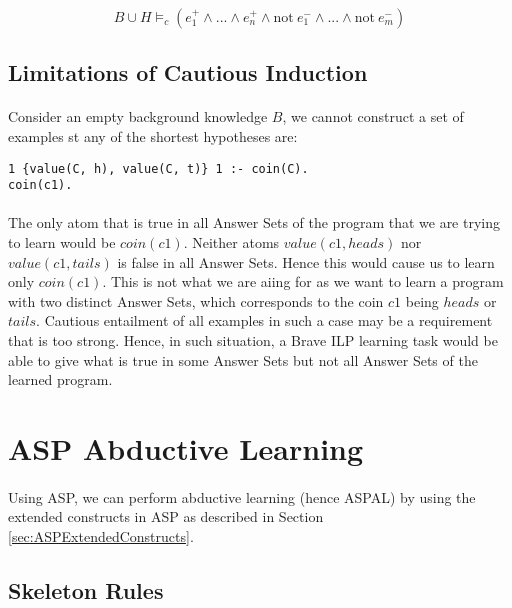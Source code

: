 \documentclass{article}
\theoremstyle{plain}
\theoremstyle{definition}
\begin{document}
\begin{multicols}{2}
$$B \cup H \models_c (e_1^+ \land ... \land e_n^+ \land \text{not}\ e_1^- \land ...  \land \text{not}\ e_m^-)$$

\subsection{Limitations of Cautious Induction}

\paragraph{} Consider an empty background knowledge $B$, we cannot construct a set of examples st any of the shortest hypotheses are:

\begin{lstlisting}
1 {value(C, h), value(C, t)} 1 :- coin(C).
coin(c1).
\end{lstlisting}

\paragraph{} The only atom that is true in all Answer Sets of the program that we are trying to learn would be $coin(c1)$. Neither atoms $value(c1, heads)$ nor $value(c1, tails)$ is false in all Answer Sets. Hence this would cause us to learn only $coin(c1)$. This is not what we are aiing for as we want to learn a program with two distinct Answer Sets, which corresponds to the coin $c1$ being $heads$ or $tails$. Cautious entailment of all examples in such a case may be a requirement that is too strong. Hence, in such situation, a Brave ILP learning task would be able to give what is true in some Answer Sets but not all Answer Sets of the learned program.

\section{ASP Abductive Learning}

\paragraph{} Using ASP, we can perform abductive learning (hence ASPAL) by using the extended constructs in ASP as described in Section \ref{sec:ASPExtendedConstructs}. 

\subsection{Skeleton Rules}


\end{multicols}
\end{document}
